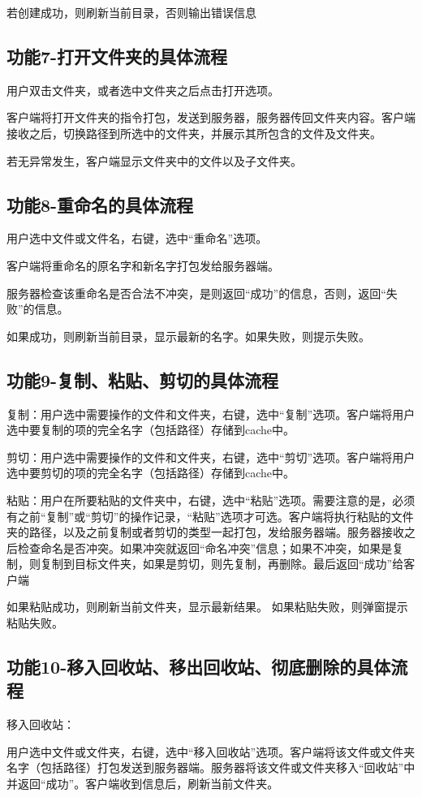 若创建成功，则刷新当前目录，否则输出错误信息


\subsection{功能7-打开文件夹的具体流程}
用户双击文件夹，或者选中文件夹之后点击打开选项。

客户端将打开文件夹的指令打包，发送到服务器，服务器传回文件夹内容。客户端接收之后，切换路径到所选中的文件夹，并展示其所包含的文件及文件夹。

若无异常发生，客户端显示文件夹中的文件以及子文件夹。


\subsection{功能8-重命名的具体流程}
用户选中文件或文件名，右键，选中“重命名”选项。

客户端将重命名的原名字和新名字打包发给服务器端。

服务器检查该重命名是否合法不冲突，是则返回“成功”的信息，否则，返回“失败”的信息。

如果成功，则刷新当前目录，显示最新的名字。如果失败，则提示失败。


\subsection{功能9-复制、粘贴、剪切的具体流程}
复制：用户选中需要操作的文件和文件夹，右键，选中“复制”选项。客户端将用户选中要复制的项的完全名字（包括路径）存储到cache中。

剪切：用户选中需要操作的文件和文件夹，右键，选中“剪切”选项。客户端将用户选中要剪切的项的完全名字（包括路径）存储到cache中。

粘贴：用户在所要粘贴的文件夹中，右键，选中“粘贴”选项。需要注意的是，必须有之前“复制”或“剪切”的操作记录，“粘贴”选项才可选。客户端将执行粘贴的文件夹的路径，以及之前复制或者剪切的类型一起打包，发给服务器端。服务器接收之后检查命名是否冲突。如果冲突就返回“命名冲突”信息；如果不冲突，如果是复制，则复制到目标文件夹，如果是剪切，则先复制，再删除。最后返回“成功”给客户端

如果粘贴成功，则刷新当前文件夹，显示最新结果。
如果粘贴失败，则弹窗提示粘贴失败。

\subsection{功能10-移入回收站、移出回收站、彻底删除的具体流程}
移入回收站：

用户选中文件或文件夹，右键，选中“移入回收站”选项。客户端将该文件或文件夹名字（包括路径）打包发送到服务器端。服务器将该文件或文件夹移入“回收站”中并返回“成功”。客户端收到信息后，刷新当前文件夹。

